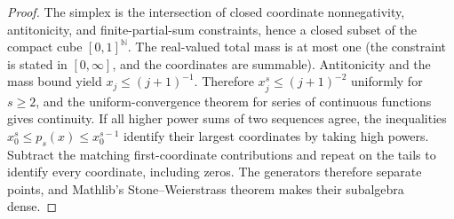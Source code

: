 \begin{proof}
  \leanok
The simplex is the intersection of closed coordinate nonnegativity, antitonicity, and finite-partial-sum constraints, hence a closed subset of the compact cube $[0,1]^{\mathbb N}$. The real-valued total mass is at most one (the constraint is stated in $[0,\infty]$, and the coordinates are summable). Antitonicity and the mass bound yield $x_j\le (j+1)^{-1}$. Therefore $x_j^s\le(j+1)^{-2}$ uniformly for $s\ge2$, and the uniform-convergence theorem for series of continuous functions gives continuity. If all higher power sums of two sequences agree, the inequalities $x_0^s\le p_s(x)\le x_0^{s-1}$ identify their largest coordinates by taking high powers. Subtract the matching first-coordinate contributions and repeat on the tails to identify every coordinate, including zeros. The generators therefore separate points, and Mathlib's Stone--Weierstrass theorem makes their subalgebra dense.
\end{proof}

